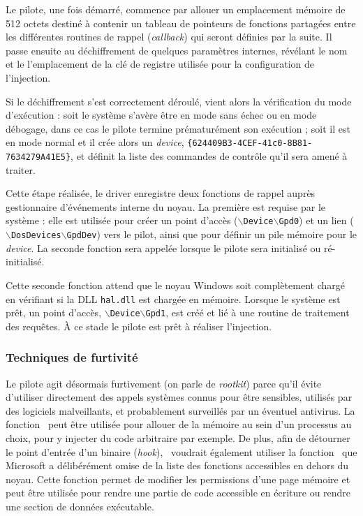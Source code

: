 Le pilote, une fois démarré, commence par allouer un emplacement mémoire de 512 octets destiné à contenir un tableau de pointeurs de fonctions partagées entre les différentes routines de rappel (\emph{callback}) qui seront définies par la suite.
Il passe ensuite au déchiffrement de quelques paramètres internes, révélant le nom et le l'emplacement de la clé de registre utilisée pour la configuration de l'injection.

Si le déchiffrement s'est correctement déroulé, vient alors la vérification du mode d'exécution : soit le système s'avère être en mode sans échec ou en mode débogage, dans ce cas le pilote termine prématurément son exécution ; soit il est en mode normal et il crée alors un \emph{device}, \texttt{\{624409B3-4CEF-41c0-8B81-7634279A41E5\}}, et définit la liste des commandes de contrôle qu'il sera amené à traiter.

Cette étape réalisée, le driver enregistre deux fonctions de rappel auprès gestionnaire d'événements interne du noyau.
La première est requise par le système : elle est utilisée pour créer un point d'accès ($\backslash$\texttt{Device}$\backslash$\texttt{Gpd0}) et un lien ($\backslash$\texttt{DosDevices}$\backslash$\texttt{GpdDev}) vers le pilot, ainsi que pour définir un pile mémoire pour le \emph{device}.
La seconde fonction sera appelée lorsque le pilote sera initialisé ou ré-initialisé. 


Cette seconde fonction attend que le noyau Windows soit complètement chargé en vérifiant si la DLL \texttt{hal.dll} est chargée en mémoire. Lorsque le système est prêt, un point d'accès, $\backslash$\texttt{Device}$\backslash$\texttt{Gpd1}, est créé et lié à une routine de traitement des requêtes. 
À ce stade le pilote est prêt à réaliser l'injection.

\subsubsection{Techniques de furtivité}
Le pilote agit désormais furtivement (on parle de \emph{rootkit}) parce qu'il évite d'utiliser directement des appels systèmes connus pour être sensibles, utilisés par des logiciels malveillants, et probablement surveillés par un éventuel antivirus.
La fonction \ZwA\ peut être utilisée pour allouer de la mémoire au sein d'un processus au choix, pour y injecter du code arbitraire par exemple.
De plus, afin de détourner le point d'entrée d'un binaire (\emph{hook}), \duqu\ voudrait également utiliser la fonction \ZwP\ que Microsoft a délibérément omise de la liste des fonctions accessibles en dehors du noyau. Cette fonction permet de modifier les permissions d'une page mémoire et peut être utilisée pour rendre une partie de code accessible en écriture ou rendre une section de données exécutable.

